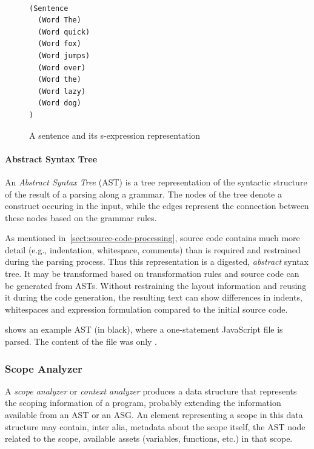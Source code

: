 \begin{figure}[!htb]
\centering
{}\\[1em]

\begin{minipage}{3cm}
\begin{verbatim}
(Sentence
  (Word The)
  (Word quick)
  (Word fox)
  (Word jumps)
  (Word over)
  (Word the)
  (Word lazy)
  (Word dog)
)
\end{verbatim}
\end{minipage}
  \caption{A sentence and its s-expression representation}
  \label{fig:sentence-s-expression}
\end{figure}

\paragraph{Abstract Syntax Tree}
An \emph{Abstract Syntax Tree} (AST) is a tree representation of the syntactic structure of the result of a parsing along a grammar. The nodes of the tree denote a construct occuring in the input, while the edges represent the connection between these nodes based on the grammar rules.

As mentioned in~\cref{sect:source-code-processing}, source code contains much more detail (e.g., indentation, whitespace, comments) than is required and restrained during the parsing process. Thus this representation is a digested, \emph{abstract} syntax tree. It may be transformed based on transformation rules and source code can be generated from ASTs. Without restraining the layout information and reusing it during the code generation, the resulting text can show differences in indents, whitespaces and expression formulation compared to the initial source code.

 shows an example AST (in black), where a one-statement JavaScript file is parsed. The content of the file was only .

\subsubsection{Scope Analyzer}
A \emph{scope analyzer} or \emph{context analyzer} produces a data structure that represents the scoping information of a program, probably extending the information available from an AST or an ASG. An element representing a scope in this data structure may contain, inter alia, metadata about the scope itself, the AST node related to the scope, available assets (variables, functions, etc.) in that scope.~\cite{shift-scope}


